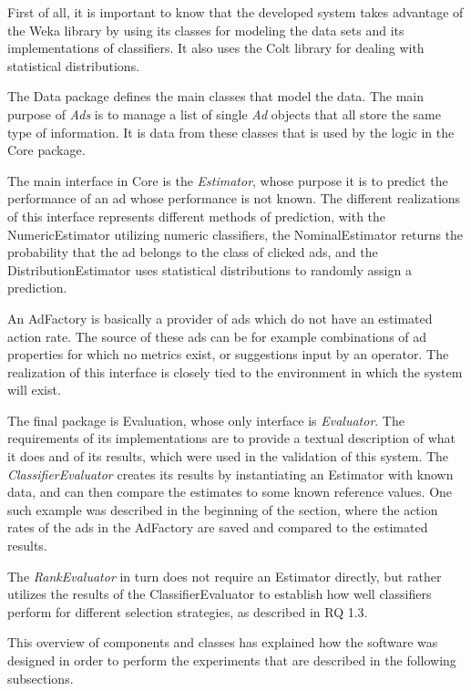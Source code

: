 \documentclass{sig-alternate}
\begin{document}
First of all, it is important to know that the developed system takes advantage of the Weka library by using its classes for modeling the data sets and its implementations of classifiers. It also uses the Colt library for dealing with statistical distributions.

The Data package defines the main classes that model the data. The main purpose of \textit{Ads} is to manage a list of single \textit{Ad} objects that all store the same type of information. It is data from these classes that is used by the logic in the Core package.

The main interface in Core is the \textit{Estimator}, whose purpose it is to predict the performance of an ad whose performance is not known. The different realizations of this interface represents different methods of prediction, with the NumericEstimator utilizing numeric classifiers, the NominalEstimator returns the probability that the ad belongs to the class of clicked ads, and the DistributionEstimator uses statistical distributions to randomly assign a prediction.

An AdFactory is basically a provider of ads which do not have an estimated action rate. The source of these ads can be for example combinations of ad properties for which no metrics exist, or suggestions input by an operator. The realization of this interface is closely tied to the environment in which the system will exist.

The final package is Evaluation, whose only interface is \textit{Evaluator}. The requirements of its implementations are to provide a textual description of what it does and of its results, which were used in the validation of this system. The \textit{ClassifierEvaluator} creates its results by instantiating an Estimator with known data, and can then compare the estimates to some known reference values. One such example was described in the beginning of the section, where the action rates of the ads in the AdFactory are saved and compared to the estimated results.

The \textit{RankEvaluator} in turn does not require an Estimator directly, but rather utilizes the results of the ClassifierEvaluator to establish how well classifiers perform for different selection strategies, as described in RQ 1.3.

This overview of components and classes has explained how the software was designed in order to perform the experiments that are described in the following subsections.
\end{document}
